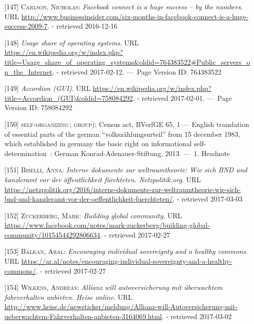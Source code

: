 \documentclass[12pt,english,a4paper,titlepage,cleardoublepage=empty,dottedtoc]{report}
\begin{document}
\hypertarget{ref-web_2009-success-of-facebook-connect}{}
{[}147{]} \textsc{Carlson, Nicholas}: \emph{Facebook connect is a huge
success -- by the numbers}. URL
\url{http://www.businessinsider.com/six-months-in-facebook-connect-is-a-huge-success-2009-7}.
- retrieved 2016-12-16

\hypertarget{ref-web_2017_wikipedia_os-market-share}{}
{[}148{]} \emph{Usage share of operating systems}. URL
\url{https://en.wikipedia.org/w/index.php?title=Usage_share_of_operating_systems\&oldid=764383522\#Public_servers_on_the_Internet}.
- retrieved 2017-02-12. ---~Page Version ID: 764383522

\hypertarget{ref-web_2016_wikipedia_accordion-gui}{}
{[}149{]} \emph{Accordion (GUI)}. URL
\url{https://en.wikipedia.org/w/index.php?title=Accordion_(GUI)\&oldid=758084292}.
- retrieved 2017-02-01. ---~Page Version ID: 758084292

\hypertarget{ref-court-decision_1983_census-act-germany}{}
{[}150{]} \textsc{self-organizing}\,; \textsc{group)}: Census act,
BVerfGE 65, 1 --- English translation of essential parts of the german
``volkszählungsurteil'' from 15 december 1983, which established in
germany the basic right on informational self-determination~: German
Konrad-Adenauer-Stiftung, 2013. ---~1. Headnote

\hypertarget{ref-web_2016_bnd-weltraumtheorie}{}
{[}151{]} \textsc{Biselli, Anna}: \emph{Interne dokumente zur
weltraumtheorie: Wie sich BND und kanzleramt vor der öffentlichkeit
fürchteten. Netzpolitik.org}. URL
\url{https://netzpolitik.org/2016/interne-dokumente-zur-weltraumtheorie-wie-sich-bnd-und-kanzleramt-vor-der-oeffentlichkeit-fuerchteten/}.
- retrieved 2017-03-03

\hypertarget{ref-web_2017_facebook_building-global-community}{}
{[}152{]} \textsc{Zuckerberg, Mark}: \emph{Building global community}.
URL
\url{https://www.facebook.com/notes/mark-zuckerberg/building-global-community/10154544292806634}.
- retrieved 2017-02-27

\hypertarget{ref-web_2017_encouraging-individual-sovereignty}{}
{[}153{]} \textsc{Balkan, Aral}: \emph{Encouraging individual
sovereignty and a healthy commons}. URL
\url{https://ar.al/notes/encouraging-individual-sovereignty-and-a-healthy-commons/}.
- retrieved 2017-02-27

\hypertarget{ref-web_2016_insurance-discount-in-return-of-data}{}
{[}154{]} \textsc{Wilkens, Andreas}: \emph{Allianz will autoversicherung
mit überwachtem fahrverhalten anbieten. Heise online}. URL
\url{http://www.heise.de/newsticker/meldung/Allianz-will-Autoversicherung-mit-ueberwachtem-Fahrverhalten-anbieten-3164069.html}.
- retrieved 2017-03-02
\end{document}
